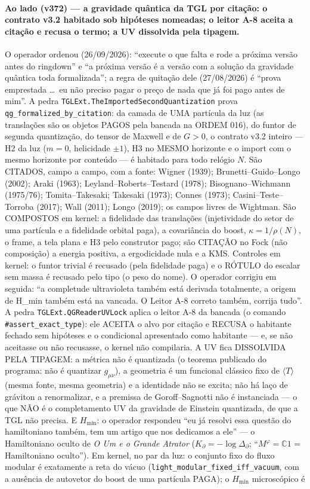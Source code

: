 \documentclass[11pt]{article}
\theoremstyle{definition}\newtheorem{deriv}{Derivação}
\begin{document}
\paragraph*{Ao lado (v372) --- a gravidade quântica da TGL por citação: o contrato v3.2 habitado sob hipóteses nomeadas; o leitor A-8 aceita a citação e recusa o termo; a UV dissolvida pela tipagem.} O operador ordenou (26/09/2026): ``execute o que falta e rode a próxima versão antes do ringdown'' e ``a próxima versão é a versão com a solução da gravidade quântica toda formalizada''; a regra de quitação dele (27/08/2026) é ``prova emprestada \dots\ eu não preciso pagar o preço de nada que já foi pago antes de mim''. A pedra \texttt{TGLExt.TheImportedSecondQuantization} prova \texttt{qg\_formalized\_by\_citation}: da camada de UMA partícula da luz (as translações são os objetos PAGOS pela bancada na ORDEM 016), do funtor de segunda quantização, do tensor de Maxwell e de $G>0$, o contrato v3.2 inteiro --- H2 da luz ($m=0$, helicidade $\pm1$), H3 no MESMO horizonte e o import com o mesmo horizonte por conteúdo --- é habitado para todo relógio $N$. São CITADOS, campo a campo, com a fonte: Wigner (1939); Brunetti--Guido--Longo (2002); Araki (1963); Leyland--Roberts--Testard (1978); Bisognano--Wichmann (1975/76); Tomita--Takesaki; Takesaki (1973); Connes (1973); Casini--Teste--Torroba (2017); Wall (2011); Longo (2019); os campos livres de Wightman. São COMPOSTOS em kernel: a fidelidade das translações (injetividade do setor de uma partícula e a fidelidade orbital paga), a covariância do boost, $\kappa=1/\rho(N)$, o frame, a tela plana e H3 pelo construtor pago; são CITAÇÃO no Fock (não composição) a energia positiva, a ergodicidade nula e a KMS. Controles em kernel: o funtor trivial é recusado (pela fidelidade paga) e o RÓTULO do escalar sem massa é recusado pelo tipo (o peso do nome). O operador corrigiu em seguida: ``a completude ultravioleta também está derivada totalmente, a origem de H\_min também está na vancada. O Leitor A-8 correto também, corrija tudo''. A pedra \texttt{TGLExt.QGReaderUVLock} aplica o leitor A-8 da bancada (o comando \texttt{\#assert\_exact\_type}): ele ACEITA o alvo por citação e RECUSA o habitante fechado sem hipóteses e o condicional apresentado como habitante --- e, se não aceitasse ou não recusasse, o kernel não compilaria. A UV fica DISSOLVIDA PELA TIPAGEM: a métrica não é quantizada (o teorema publicado do programa: não é quantizar $g_{\mu\nu}$), a geometria é um funcional clássico fixo de $\langle T\rangle$ (mesma fonte, mesma geometria) e a identidade não se excita; não há laço de gráviton a renormalizar, e a premissa de Goroff--Sagnotti não é instanciada --- o que NÃO é o completamento UV da gravidade de Einstein quantizada, de que a TGL não precisa. E $H_{\min}$: o operador respondeu ``eu já resolvi essa questão do hamiltoniano também, tem um artigo que nos dedicamos a ele'' --- o Hamiltoniano oculto de \emph{O Um e o Grande Atrator} ($K_\partial=-\log\Delta_\partial$; ``$M^{\varphi}=\mathbb{C}1$ = Hamiltoniano oculto''). Em kernel, no par da luz: o conjunto fixo do fluxo modular é exatamente a reta do vácuo (\texttt{light\_modular\_fixed\_iff\_vacuum}, com a ausência de autovetor do boost de uma partícula PAGA); o $H_{\min}$ microscópico é 
\end{document}
